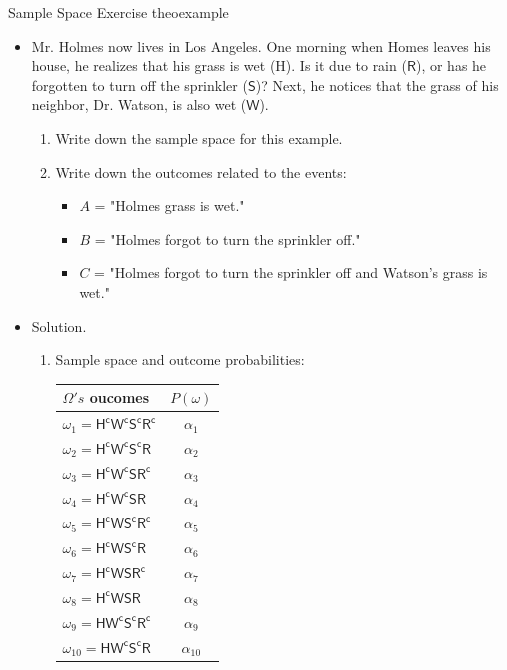 \documentclass{tufte-handout}
\begin{document}
\begin{mybox}{Sample Space Exercise }{theoexample}
\small
\begin{itemize}
\item Mr. Holmes now lives in Los Angeles. One morning when Homes leaves his house, he realizes that his grass is wet (H). Is it due to rain ($\mathsf R$), or has he forgotten to turn off the sprinkler ($\mathsf S$)? Next, he notices that the grass of his neighbor, Dr. Watson, is also wet ($\mathsf W$). 
\begin{enumerate}
 \item Write down the sample space for this example.
 \item Write down the outcomes related to the events: 
\begin{itemize}
\item $A$ = "Holmes grass is wet."
\item $B$ = "Holmes forgot to turn the sprinkler off."
\item $C$ = "Holmes forgot to turn the sprinkler off and Watson's grass is wet."
\end{itemize} 
\end{enumerate}
\item Solution.
\begin{enumerate}
\item Sample space and outcome probabilities:
   \begin{center}
  \begin{tabular}{ |l|c|}
    \hline
     $\Omega's$ oucomes & $P(\omega)$ \\\hline
    $\omega_1 = \mathsf{H^cW^cS^cR^c}$ &  $\alpha_1$\\\hline
    $\omega_2 =\mathsf{H^cW^cS^cR}$    &  $\alpha_2$\\\hline
    $\omega_3 =\mathsf{H^cW^cSR^c}$    &  $\alpha_3$\\\hline
    $\omega_4 =\mathsf{H^cW^cSR}$        &  $\alpha_4$\\\hline
    $\omega_5 =\mathsf{H^cWS^cR^c}$     & $\alpha_5$\\\hline
    $\omega_6 =\mathsf{H^cWS^cR}$        & $\alpha_6$\\\hline     
    $\omega_7 =\mathsf{H^cWSR^c}$        & $\alpha_7$\\\hline
    $\omega_8 =\mathsf{H^cWSR}$           & $\alpha_8$\\\hline
    $\omega_9 =\mathsf{HW^cS^cR^c}$    & $\alpha_9$\\ \hline    
    $\omega_{10} =\mathsf{HW^cS^cR}$       & $\alpha_{10}$\\\hline

\end{tabular}
\end{center}
\end{enumerate}
\end{itemize}
\end{mybox}
\end{document}
